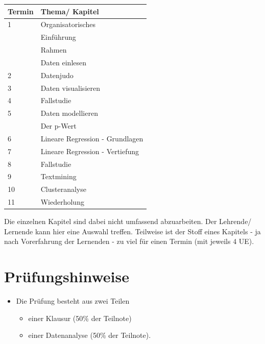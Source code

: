 \documentclass[12pt,ngerman,]{book}
\providecommand{\tightlist}{%
  \setlength{\itemsep}{0pt}\setlength{\parskip}{0pt}}
\begin{document}
\begin{longtable}[]{@{}ll@{}}
\toprule
Termin & Thema/ Kapitel\tabularnewline
\midrule
\endhead
1 & Organisatorisches\tabularnewline
\begin{minipage}[t]{0.48\columnwidth}\raggedright\strut
\strut
\end{minipage} & \begin{minipage}[t]{0.48\columnwidth}\raggedright\strut
Einführung\strut
\end{minipage}\tabularnewline
\begin{minipage}[t]{0.48\columnwidth}\raggedright\strut
\strut
\end{minipage} & \begin{minipage}[t]{0.48\columnwidth}\raggedright\strut
Rahmen\strut
\end{minipage}\tabularnewline
\begin{minipage}[t]{0.48\columnwidth}\raggedright\strut
\strut
\end{minipage} & \begin{minipage}[t]{0.48\columnwidth}\raggedright\strut
Daten einlesen\strut
\end{minipage}\tabularnewline
2 & Datenjudo\tabularnewline
3 & Daten visualisieren\tabularnewline
4 & Fallstudie\tabularnewline
5 & Daten modellieren\tabularnewline
\begin{minipage}[t]{0.48\columnwidth}\raggedright\strut
\strut
\end{minipage} & \begin{minipage}[t]{0.48\columnwidth}\raggedright\strut
Der p-Wert\strut
\end{minipage}\tabularnewline
6 & Lineare Regression - Grundlagen\tabularnewline
7 & Lineare Regression - Vertiefung\tabularnewline
8 & Fallstudie\tabularnewline
9 & Textmining\tabularnewline
10 & Clusteranalyse\tabularnewline
11 & Wiederholung\tabularnewline
\bottomrule
\end{longtable}

Die einzelnen Kapitel sind dabei nicht umfassend abzuarbeiten. Der
Lehrende/ Lernende kann hier eine Auswahl treffen. Teilweise ist der
Stoff eines Kapitels - ja nach Vorerfahrung der Lernenden - zu viel für
einen Termin (mit jeweils 4 UE).

\chapter{Prüfungshinweise}\label{prufungshinweise-1}

\begin{itemize}
\tightlist
\item
  Die Prüfung besteht aus zwei Teilen

  \begin{itemize}
  \tightlist
  \item
    einer Klausur (50\% der Teilnote)
  \item
    einer Datenanalyse (50\% der Teilnote).
  \end{itemize}
\end{itemize}
\end{document}
